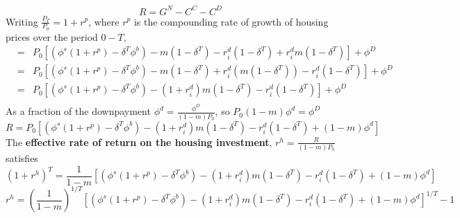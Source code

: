 \[R=G^N-C^C- C^D  \]
Writing $\frac{P_T}{P_0}= 1+r^p$, where $r^p$ is the compounding rate of growth of housing prices over the period $0-T$,  
\begin{eqnarray}
&=&P_0 \left[\left(\phi^s  (1+r^p) - \delta^T\phi^b\right)  -  m(1- \delta^T)  %
-  r_i^d(1-\delta^T) +r_i^d m(1-\delta^T)  \right]    + \phi^D   \nonumber \\
&=&P_0 \left[\left(\phi^s  (1+r^p) - \delta^T\phi^b\right)  -  m(1- \delta^T)+r_i^d\left(m(1-\delta^T) \right)  %
-  r_i^d(1-\delta^T)  \right]    + \phi^D   \nonumber \\
&=&P_0 \left[\left(\phi^s  (1+r^p) - \delta^T\phi^b\right)  - (1+r_i^d) m(1- \delta^T)  %
-  r_i^d(1-\delta^T)  \right]    + \phi^D   \nonumber \\
%
\end{eqnarray}
%
As a fraction of the downpayment  $\phi^d=\frac{\phi^D}{(1-m)P_0}$, so $P_0(1-m)\phi^d=\phi^D$
%
\[R=P_0 \left[\left(\phi^s  (1+r^p) - \delta^T\phi^b\right)  - (1+r_i^d) m(1- \delta^T)  %
-  r_i^d(1-\delta^T)  + (1- m)\phi^d \right]  \]
%
The \textbf{effective rate of  return on the housing investment}, $r^h=\frac{R}{(1-m)P_0}$ satisfies 
\[ (1+r^h)^T =  \frac{1}{1-m} \left[\left(\phi^s  (1+r^p) - \delta^T\phi^b\right)  - (1+r_i^d) m(1- \delta^T)  
-  r_i^d(1-\delta^T)  + (1- m)\phi^d \right]  \]
\[r^h   = \left(\frac{1}{1-m}\right)^{1/T} \left[\left(\phi^s  (1+r^p) - \delta^T\phi^b\right)  - (1+r_i^d) m(1- \delta^T)  -  r_i^d(1-\delta^T)  + (1- m)\phi^d \right] ^{1/T} -1  
        \]

